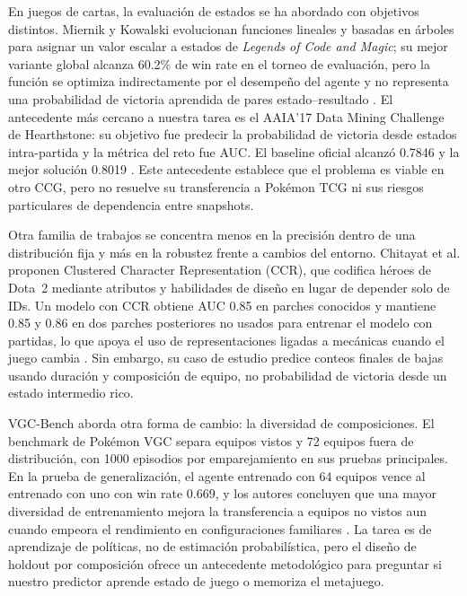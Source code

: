 En juegos de cartas, la evaluación de estados se ha abordado con
objetivos distintos. Miernik y Kowalski evolucionan funciones lineales
y basadas en árboles para asignar un valor escalar a estados de
\emph{Legends of Code and Magic}; su mejor variante global alcanza
60.2\% de win rate en el torneo de evaluación, pero la función se
optimiza indirectamente por el desempeño del agente y no representa
una probabilidad de victoria aprendida de pares estado--resultado
\cite{miernik_evolving_2022}. El antecedente más cercano a nuestra tarea
es el AAIA'17 Data Mining Challenge de Hearthstone: su objetivo fue
predecir la probabilidad de victoria desde estados intra-partida y la
métrica del reto fue AUC. El baseline oficial alcanzó 0.7846 y la mejor
solución 0.8019 \cite{janusz_hearthstone_2017}. Este antecedente
establece que el problema es viable en otro CCG, pero no resuelve su
transferencia a Pokémon TCG ni sus riesgos particulares de dependencia
entre snapshots.

Otra familia de trabajos se concentra menos en la precisión dentro de
una distribución fija y más en la robustez frente a cambios del
entorno. Chitayat et al. proponen Clustered Character Representation
(CCR), que codifica héroes de Dota~2 mediante atributos y habilidades
de diseño en lugar de depender solo de IDs. Un modelo con CCR obtiene
AUC 0.85 en parches conocidos y mantiene 0.85 y 0.86 en dos parches
posteriores no usados para entrenar el modelo con partidas, lo que
apoya el uso de representaciones ligadas a mecánicas cuando el juego
cambia \cite{chitayat_meta_2023}. Sin embargo, su caso de estudio
predice conteos finales de bajas usando duración y composición de
equipo, no probabilidad de victoria desde un estado intermedio rico.

VGC-Bench aborda otra forma de cambio: la diversidad de composiciones.
El benchmark de Pokémon VGC separa equipos vistos y 72 equipos fuera de
distribución, con 1000 episodios por emparejamiento en sus pruebas
principales. En la prueba de generalización, el agente entrenado con 64
equipos vence al entrenado con uno con win rate 0.669, y los autores
concluyen que una mayor diversidad de entrenamiento mejora la
transferencia a equipos no vistos aun cuando empeora el rendimiento en
configuraciones familiares \cite{angliss_vgcbench_2026}. La tarea es de
aprendizaje de políticas, no de estimación probabilística, pero el
diseño de holdout por composición ofrece un antecedente metodológico
para preguntar si nuestro predictor aprende estado de juego o memoriza
el metajuego.

